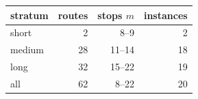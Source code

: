 \begin{tabular}{lrrr}
\toprule
stratum & routes & stops $m$ & instances \\
\midrule
short & 2 & 8--9 & 2 \\
medium & 28 & 11--14 & 18 \\
long & 32 & 15--22 & 19 \\
all & 62 & 8--22 & 20 \\
\bottomrule
\end{tabular}
